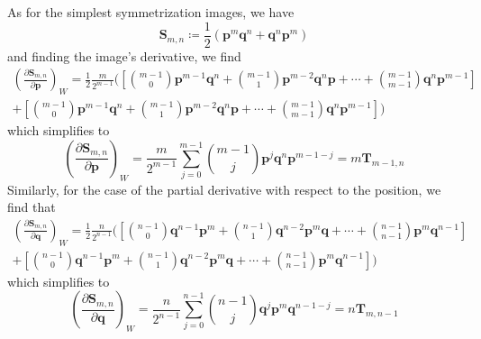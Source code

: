 \documentclass[a4paper]{article}
\theoremstyle{definition}
\begin{document}
As for the simplest symmetrization images, we have
\begin{equation}
	\textbf{S}_{m,n}\coloneqq\frac{1}{2}(\textbf{p}^m\textbf{q}^n+\textbf{q}^n\textbf{p}^m)
\end{equation}
and finding the image's derivative, we find
\begin{multline}
	\left(\frac{\partial\textbf{S}_{m,n}}{\partial\textbf{p}}\right)_W=\frac{1}{2}\frac{m}{2^{m-1}}\biggl(\left[\binom{m-1}{0}\textbf{p}^{m-1}\textbf{q}^n+\binom{m-1}{1}\textbf{p}^{m-2}\textbf{q}^n\textbf{p}+\cdots+\binom{m-1}{m-1}\textbf{q}^n\textbf{p}^{m-1}\right]\\+\left[\binom{m-1}{0}\textbf{p}^{m-1}\textbf{q}^n+\binom{m-1}{1}\textbf{p}^{m-2}\textbf{q}^n\textbf{p}+\cdots+\binom{m-1}{m-1}\textbf{q}^n\textbf{p}^{m-1}\right]\biggr)
\end{multline}
which simplifies to
\begin{equation}
	\left(\frac{\partial\textbf{S}_{m,n}}{\partial\textbf{p}}\right)_W=\frac{m}{2^{m-1}}\sum_{j=0}^{m-1}\binom{m-1}{j}\textbf{p}^j\textbf{q}^n\textbf{p}^{m-1-j}=m\textbf{T}_{m-1,n}
\end{equation}
Similarly, for the case of the partial derivative with respect to the position, we find that
\begin{multline}
		\left(\frac{\partial\textbf{S}_{m,n}}{\partial\textbf{q}}\right)_W=\frac{1}{2}\frac{n}{2^{n-1}}\biggl(\left[\binom{n-1}{0}\textbf{q}^{n-1}\textbf{p}^m+\binom{n-1}{1}\textbf{q}^{n-2}\textbf{p}^m\textbf{q}+\cdots+\binom{n-1}{n-1}\textbf{p}^m\textbf{q}^{n-1}\right]\\+\left[\binom{n-1}{0}\textbf{q}^{n-1}\textbf{p}^m+\binom{n-1}{1}\textbf{q}^{n-2}\textbf{p}^m\textbf{q}+\cdots+\binom{n-1}{n-1}\textbf{p}^m\textbf{q}^{n-1}\right]\biggr)
\end{multline}
which simplifies to
\begin{equation}
	\left(\frac{\partial\textbf{S}_{m,n}}{\partial\textbf{q}}\right)_W=\frac{n}{2^{n-1}}\sum_{j=0}^{n-1}\binom{n-1}{j}\textbf{q}^j\textbf{p}^m\textbf{q}^{n-1-j}=n\textbf{T}_{m,n-1}
\end{equation}
\end{document}

